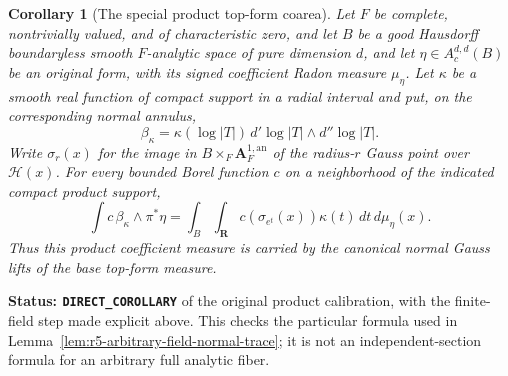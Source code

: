 \documentclass[11pt,a4paper]{article}
\numberwithin{equation}{section}
\newtheorem{corollary}[theorem]{Corollary}
\theoremstyle{definition}
\theoremstyle{remark}
\begin{document}
\begin{corollary}[The special product top-form coarea]
\label{cor:r5-product-top-gauss-calibration}
Let $F$ be complete, nontrivially valued, and of characteristic
zero, and let $B$ be a good Hausdorff boundaryless
smooth $F$-analytic space of pure dimension $d$, and let
$\eta\in A_c^{d,d}(B)$ be an original form, with its signed
coefficient Radon measure $\mu_\eta$.  Let $\kappa$ be a
smooth real function of compact support in a radial interval
and put, on the corresponding normal annulus,
\[
 \beta_\kappa
    =\kappa(\log|T|)\,d'\log|T|\wedge d''\log|T|.
\]
Write $\sigma_r(x)$ for the image in
$B\times_F\mathbf A_F^{1,\mathrm{an}}$ of the radius-$r$
Gauss point over $\mathscr H(x)$.  For every bounded Borel
function $c$ on a neighborhood of the indicated compact
product support,
\begin{equation}
 \int c\,\beta_\kappa\wedge\pi^*\eta
  =\int_B\int_{\mathbf R}
        c(\sigma_{e^t}(x))\kappa(t)\,dt\,d\mu_\eta(x).
 \label{eq:r5-product-top-gauss-calibration}
\end{equation}
Thus this product coefficient measure is carried by the
canonical normal Gauss lifts of the base top-form measure.
\end{corollary}

\noindent\textbf{Status: \texttt{DIRECT\_COROLLARY}} of the
original product calibration, with the finite-field step made
explicit above.  This checks the particular formula used in
Lemma~\ref{lem:r5-arbitrary-field-normal-trace}; it is not an
independent-section formula for an arbitrary full analytic fiber.
\end{document}
